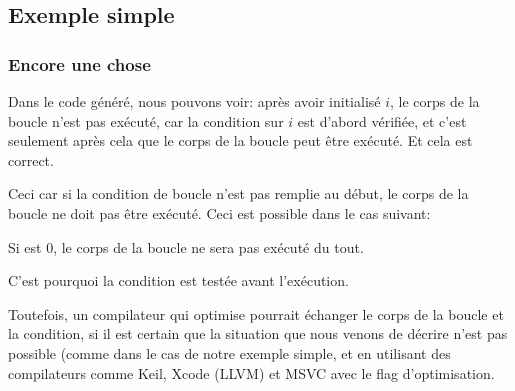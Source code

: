 \subsection{Exemple simple}





\subsubsection{Encore une chose}

Dans le code généré, nous pouvons voir:
après avoir initialisé $i$, le corps de la boucle n'est pas exécuté, car la condition
sur $i$ est d'abord vérifiée, et c'est seulement après cela que le corps de la boucle
peut être exécuté.
Et cela est correct.

Ceci car si la condition de boucle n'est pas remplie au début, le corps de la boucle
ne doit pas être exécuté.
Ceci est possible dans le cas suivant:



Si  est 0, le corps de la boucle ne sera
pas exécuté du tout.

C'est pourquoi la condition est testée avant l'exécution.

Toutefois, un compilateur qui optimise pourrait échanger le corps de la boucle et
la condition, si il est certain que la situation que nous venons de décrire n'est
pas possible (comme dans le cas de notre exemple simple, et en utilisant des compilateurs
comme Keil, Xcode (LLVM) et MSVC avec le flag d'optimisation.
